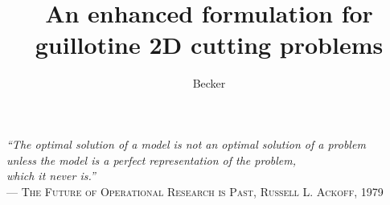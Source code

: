 \documentclass[ppgc,prop-tese,english,formais,babel]{iiufrgs}
\title{An enhanced formulation for guillotine 2D cutting problems
}
\author{Becker}{Henrique}
\begin{document}
\maketitle

\clearpage
\begin{flushright}
\mbox{}\vfill
{\sffamily\itshape
``The optimal solution of a model is not an optimal solution of a problem\\
unless the model is a perfect representation of the problem,\\
which it never is.''\\}
--- \textsc{The Future of Operational Research is Past, Russell L. Ackoff, 1979}
\end{flushright}

\end{document}
